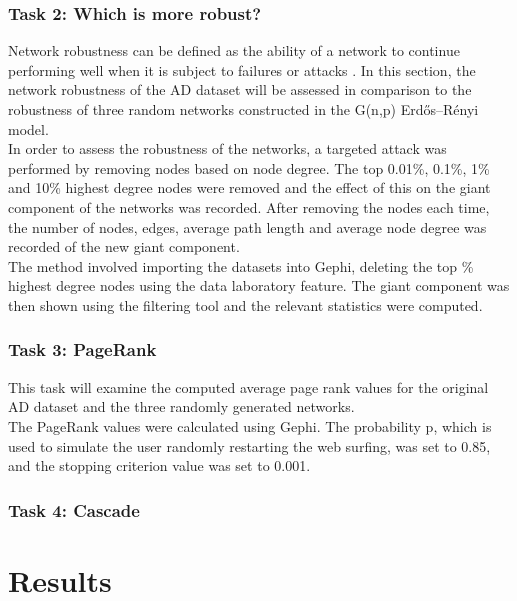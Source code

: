 \documentclass[conference]{IEEEtran}
\begin{document}
		\subsubsection{Task 2: Which is more robust?}
			{
				Network robustness can be defined as the ability of a network to continue performing well when it is subject to failures or attacks \cite{robustness}. In this section, the network robustness of the AD dataset will be assessed in comparison to the robustness of three random networks constructed in the G(n,p) Erdős–Rényi model. \\

				In order to assess the robustness of the networks, a targeted attack was performed by removing nodes based on node degree. The top 0.01\%, 0.1\%, 1\% and 10\% highest degree nodes were removed and the effect of this on the giant component of the networks was recorded. After removing the nodes each time, the number of nodes, edges, average path length and average node degree was recorded of the new giant component. \\

				The method involved importing the datasets into Gephi, deleting the top \% highest degree nodes using the data laboratory feature. The giant component was then shown using the filtering tool and the relevant statistics were computed.
			\par}
		
		
		\subsubsection{Task 3: PageRank}	
			{
				This task will examine the computed average page rank values for the original AD dataset and the three randomly generated networks. \\
				
				The PageRank values were calculated using Gephi. The probability p, which is used to simulate the user randomly restarting the web surfing, was set to 0.85, and the stopping criterion value was set to 0.001.
			\par}
			
			
		\subsubsection{Task 4: Cascade}
			
			

\section{Results}
\end{document}
